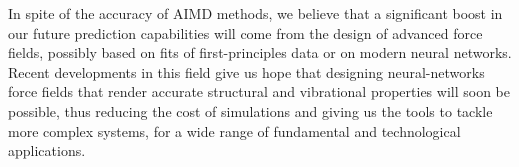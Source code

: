 \smallskip
In spite of the accuracy of AIMD methods, we believe that a significant boost in our future prediction capabilities will come from the design of advanced force fields, possibly based on fits of first-principles data or on modern neural networks. Recent developments in this field give us hope that designing neural-networks force fields that render accurate structural and vibrational properties will soon be possible, thus reducing the cost of simulations and giving us the tools to tackle more complex systems, for a wide range of fundamental and technological applications. 


    
